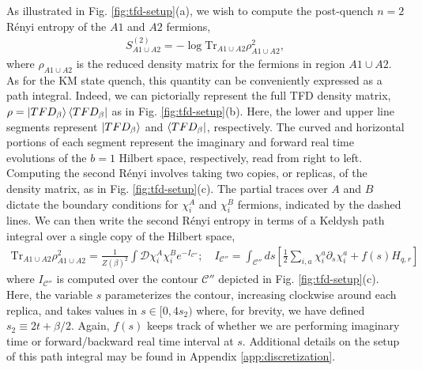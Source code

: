 \documentclass[reprint, floatfix,eqsecnum,superscriptaddress,preprint,nofootinbib,onecolumn,amsmath,amssymb,aps,prb]{revtex4-2}
\begin{document}

As illustrated in Fig. \ref{fig:tfd-setup}(a), we wish to compute the post-quench $n=2$ R\'enyi entropy of the $A1$ and $A2$ fermions, %
\begin{align}
	S^{(2)}_{A1\cup A2} = - \log \mathrm{Tr}_{A1\cup A2} \rho^2_{A1\cup A2}, \label{eqn:tfd-s2-def}
\end{align}
where $\rho_{A1\cup A2}$
is the reduced density matrix for the fermions in region $A1\cup A2$. 
As for the KM state quench, this quantity can be conveniently expressed as a path integral. Indeed, we can pictorially represent the full TFD density matrix, $\rho = \ket{TFD_\beta}\bra{TFD_\beta}$ as in Fig. \ref{fig:tfd-setup}(b). Here, the lower and upper line segments represent $\ket{TFD_\beta}$ and $\bra{TFD_\beta}$, respectively. The curved and horizontal portions of each segment represent the imaginary and forward real time evolutions of the $b=1$ Hilbert space, respectively, read from right to left.  Computing the second R\'enyi involves taking two copies, or replicas, of the density matrix, as in Fig. \ref{fig:tfd-setup}(c). The partial traces over $A$ and $B$ dictate the boundary conditions for $\chi^A_i$ and $\chi_i^B$ fermions, indicated by the dashed lines. 
We can then write the second R\'enyi entropy in terms of a Keldysh path integral over a single copy of the Hilbert space, 
\begin{align}
    \mathrm{Tr}_{A1\cup A2} \rho^2_{A1\cup A2} = \frac{1}{Z(\beta)^2} \int \mathcal{D}\chi_i^A \chi_i^B e^{- I_{\mathcal{C}''} }; \quad
    I_{\mathcal{C}''} = \int_{\mathcal{C}''} ds \left[ \frac{1}{2}\sum_{i,a} \chi_i^a \partial_s \chi_i^a + f(s) H_{q,r} \right] \label{eqn:contour-action} %
\end{align}
where $I_{\mathcal{C}''}$ is
computed over the contour $\mathcal{C}''$ depicted in Fig. \ref{fig:tfd-setup}(c). %
Here, the variable $s$ parameterizes the contour, increasing clockwise around each replica, and takes values in $s \in [0,4s_2)$ where, for brevity, we have defined $s_2 \equiv 2t + \beta/2$. 
Again, $f(s)$ keeps track of whether we are performing imaginary time or forward/backward real time interval at $s$.
Additional details on the setup of this path integral may be found in Appendix \ref{app:discretization}.
\end{document}
